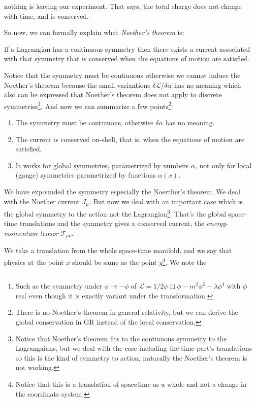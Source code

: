 \documentclass[12pt,openany]{book}
\begin{document}
	nothing is leaving our experiment. That says, the total charge does not change with time, and is conserved.\par 
	So now, we can formally explain what \textit{Noether's theorem} is:
	\begin{framed}
		If a Lagrangian has a continuous symmetry then there exists a current associated with that symmetry that is conserved when the equations of motion are satisfied.
	\end{framed}\par 
	Notice that the symmetry must be continuous otherwise we cannot induce the Noether's theorem because the small variantions $\delta\mathcal{L}/\delta\alpha$ has no meaning which also can be expressed 
	that Noether's theorem does not apply to discrete symmetries\footnote{Such as the symmetry under $\phi\rightarrow-\phi$ of $\mathcal{L}=1/2\phi\Box\phi-m^2\phi^2-\lambda\phi^4$ with $\phi$ real even though it is exactly variant under the transformation.}.
	And now we can summarize a few points\footnote{There is no Noether's theorem in general relativity, but we can derive the global conservation in GR instead of the local conservation.}:
	\begin{enumerate}
		\item The symmetry must be continuous, otherwise $\delta\alpha$ has no meaning.\\
		\item The current is conserved on-shell, that is, when the equations of motion are satisfied.\\
		\item It works for global symmetries, parametrized by numbers $\alpha$, not only for local (gauge) symmetries parametrized by functions $\alpha(x)$.
	\end{enumerate}\par 
	We have expounded the symmetry especially the Noerther's theorem. We deal with the Noether current $J_\mu$. But now we deal with an important case which is the global symmetry to the action not the Lagrangian\footnote{Notice that Noether's theorem fits to the continuous symmetry to the Lagrangaians, but we deal with the case including the time part's translations so this is the kind of symmetry to action, naturally the Noether's theorem is not working.}. That's the 
	global space-time translations and the symmetry gives a conserved current, the \textit{energy-momentum tensor} $\mathcal{T}_{\mu\nu}$.\par 
	We take a translation from the whole space-time manifold, and we say that physics at the point $x$ should be same as the point $y$\footnote{Notice that this is a translation of spacetime as a whole and not a change in the coordinate system.}. We note the 
\end{document}
